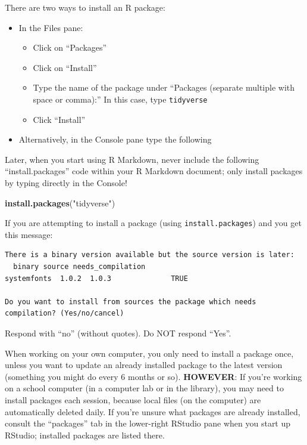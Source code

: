 \documentclass[
]{book}
\newenvironment{Shaded}{\begin{snugshade}}{\end{snugshade}}
\newcommand{\FunctionTok}[1]{\textcolor[rgb]{0.13,0.29,0.53}{\textbf{#1}}}
\newcommand{\NormalTok}[1]{#1}
\newcommand{\StringTok}[1]{\textcolor[rgb]{0.31,0.60,0.02}{#1}}
\providecommand{\tightlist}{%
  \setlength{\itemsep}{0pt}\setlength{\parskip}{0pt}}
\begin{document}
There are two ways to install an R package:

\begin{itemize}
\tightlist
\item
  In the Files pane:

  \begin{itemize}
  \tightlist
  \item
    Click on ``Packages''
  \item
    Click on ``Install''
  \item
    Type the name of the package under ``Packages (separate multiple with space or comma):'' In this case, type \texttt{tidyverse}
  \item
    Click ``Install''
  \end{itemize}
\item
  Alternatively, in the Console pane type the following
\end{itemize}

Later, when you start using R Markdown, never include the following ``install.packages'' code within your R Markdown document; only install packages by typing directly in the Console!

\begin{Shaded}
\begin{Highlighting}[]
\FunctionTok{install.packages}\NormalTok{(}\StringTok{"tidyverse"}\NormalTok{)}
\end{Highlighting}
\end{Shaded}

If you are attempting to install a package (using \texttt{install.packages}) and you get this message:

\begin{verbatim}
There is a binary version available but the source version is later:
  binary source needs_compilation
systemfonts  1.0.2  1.0.3              TRUE

Do you want to install from sources the package which needs compilation? (Yes/no/cancel)
\end{verbatim}

Respond with ``no'' (without quotes). Do NOT respond ``Yes''.

When working on your own computer, you only need to install a package once, unless you want to update an already installed package to the latest version (something you might do every 6 months or so). \textbf{HOWEVER}: If you're working on a school computer (in a computer lab or in the library), you may need to install packages each session, because local files (on the computer) are automatically deleted daily. If you're unsure what packages are already installed, consult the ``packages'' tab in the lower-right RStudio pane when you start up RStudio; installed packages are listed there.
\end{document}
